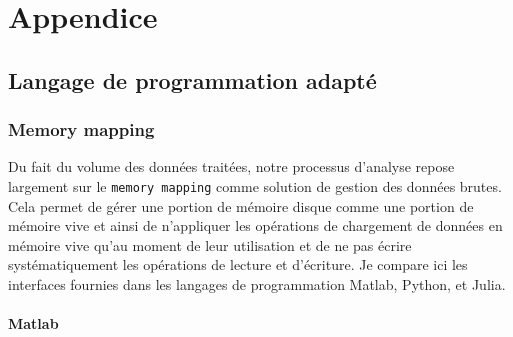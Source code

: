 



\lstset{%
    breaklines=true, %
    showstringspaces=false,%
    frame=leftline,%
}
\newcommand\matlabstyle{\lstset{language=Matlab,%
    basicstyle=\ttfamily\small,
    keywordstyle=\color{blue},%
    stringstyle=\color{mylilas},%
    commentstyle=\color{mygreen},%
    numberstyle={\small \color{black}},%
    numbersep=10pt, %
    emph=[1]{classdef, for,end,break},emphstyle=[1]\color{red},%
}}
\newcommand\pythonstyle{\lstset{language=Python,%
    basicstyle=\ttfamily\small,%
    keywordstyle=\color{deepblue},%
    stringstyle=\color{deepgreen},%
    commentstyle=\color{lightgray},%
    otherkeywords={self},
}}






\chapter{Appendice}


\section{Langage de programmation adapté}

\subsection{Memory mapping}

Du fait du volume des données traitées, notre processus d'analyse repose largement sur le \verb|memory mapping| comme solution de gestion des données brutes. Cela permet de gérer une portion de mémoire disque comme une portion de mémoire vive et ainsi de n'appliquer les opérations de chargement de données en mémoire vive qu'au moment de leur utilisation et de ne pas écrire systématiquement les opérations de lecture et d'écriture. Je compare ici les interfaces fournies dans les langages de programmation Matlab, Python, et Julia.

\subsubsection{Matlab}

